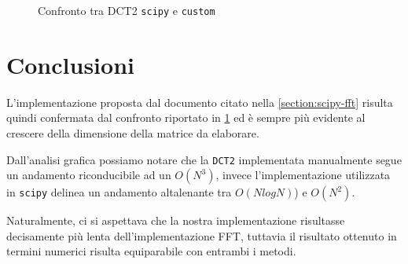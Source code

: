 \documentclass[11pt,italian]{article}
\begin{document}
\begin{figure}[H]
    \caption{Confronto tra DCT2 \lstinline{scipy} e \lstinline{custom}}
    \label{fig:execution-time}
\end{figure}

\section{Conclusioni}
L'implementazione proposta dal documento citato nella \cref{section:scipy-fft} risulta quindi confermata dal confronto riportato in \cref{fig:execution-time} ed è sempre più evidente al crescere della dimensione della matrice da elaborare.

Dall'analisi grafica possiamo notare che la \lstinline{DCT2} implementata manualmente segue un andamento riconducibile ad un $O(N^3)$, invece l'implementazione utilizzata in \lstinline{scipy} delinea un andamento altalenante tra $O(NlogN)$) e $O(N^2)$.

Naturalmente, ci si aspettava che la nostra implementazione risultasse decisamente più lenta dell'implementazione FFT, tuttavia il risultato ottenuto in termini numerici risulta equiparabile con entrambi i metodi.
\end{document}
